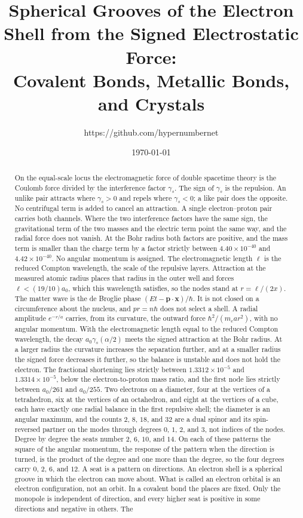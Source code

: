 \documentclass[a4paper]{article}
\title{Spherical Grooves of the Electron Shell from the Signed Electrostatic Force:\\
Covalent Bonds, Metallic Bonds, and Crystals}
\author{https://github.com/hypernumbernet}
\date{\today}
\begin{document}
\maketitle

\begin{abstract}
On the equal-scale locus the electromagnetic force of double spacetime theory is the Coulomb force divided by the interference factor \(\gamma_s\). The sign of \(\gamma_s\) is the repulsion. An unlike pair attracts where \(\gamma_s>0\) and repels where \(\gamma_s<0\); a like pair does the opposite. No centrifugal term is added to cancel an attraction. A single electron--proton pair carries both channels. Where the two interference factors have the same sign, the gravitational term of the two masses and the electric term point the same way, and the radial force does not vanish. At the Bohr radius both factors are positive, and the mass term is smaller than the charge term by a factor strictly between \(4.40\times 10^{-40}\) and \(4.42\times 10^{-40}\). No angular momentum is assigned. The electromagnetic length \(\ell\) is the reduced Compton wavelength, the scale of the repulsive layers. Attraction at the measured atomic radius places that radius in the outer well and forces \(\ell<(19/10)a_0\), which this wavelength satisfies, so the nodes stand at \(r=\ell/(2x)\). The matter wave is the de Broglie phase \((Et-\mathbf{p}\cdot\mathbf{x})/\hbar\). It is not closed on a circumference about the nucleus, and \(pr=n\hbar\) does not select a shell. A radial amplitude \(e^{-r/a}\) carries, from its curvature, the outward force \(\hbar^{2}/(m_e a r^{2})\), with no angular momentum. With the electromagnetic length equal to the reduced Compton wavelength, the decay \(a_0\gamma_s(\alpha/2)\) meets the signed attraction at the Bohr radius. At a larger radius the curvature increases the separation further, and at a smaller radius the signed force decreases it further, so the balance is unstable and does not hold the electron. The fractional shortening lies strictly between \(1.3312\times 10^{-5}\) and \(1.3314\times 10^{-5}\), below the electron-to-proton mass ratio, and the first node lies strictly between \(a_0/261\) and \(a_0/255\). Two electrons on a diameter, four at the vertices of a tetrahedron, six at the vertices of an octahedron, and eight at the vertices of a cube, each have exactly one radial balance in the first repulsive shell; the diameter is an angular maximum, and the counts \(2\), \(8\), \(18\), and \(32\) are a dual spinor and its spin-reversed partner on the modes through degrees \(0\), \(1\), \(2\), and \(3\), not indices of the nodes. Degree by degree the seats number \(2\), \(6\), \(10\), and \(14\). On each of these patterns the square of the angular momentum, the response of the pattern when the direction is turned, is the product of the degree and one more than the degree, so the four degrees carry \(0\), \(2\), \(6\), and \(12\). A seat is a pattern on directions. An electron shell is a spherical groove in which the electron can move about. What is called an electron orbital is an electron configuration, not an orbit. In a covalent bond the places are fixed. Only the monopole is independent of direction, and every higher seat is positive in some directions and negative in others. The 
\end{abstract}
\end{document}
